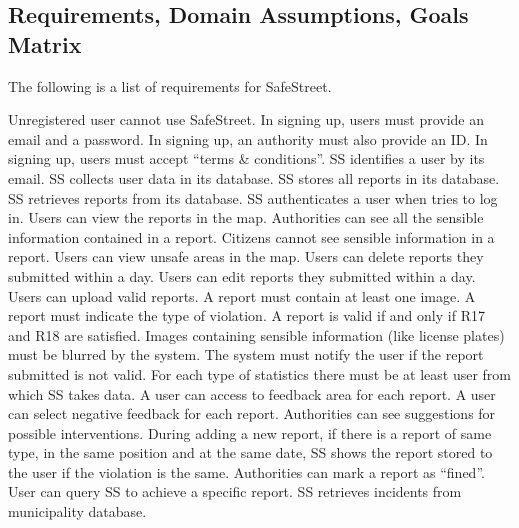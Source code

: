 \documentclass[../RASD.tex]{subfiles}
\begin{document}
            \subsection{Requirements, Domain Assumptions, Goals Matrix}\label{subsec:requirements,-domain-assumptions,-goals-matrix}
    The following is a list of requirements for SafeStreet.
    \begin{enumerate}
         Unregistered user cannot use SafeStreet.
         In signing up, users must provide an email and a password.
         In signing up, an authority must also provide an ID.
         In signing up, users must accept “terms \& conditions”.
         SS identifies a user by its email.
         SS collects user data in its database.
         SS stores all reports in its database.
         SS retrieves reports from its database.
         SS authenticates a user when tries to log in.
         Users can view the reports in the map.
         Authorities can see all the sensible information contained in a report.
         Citizens cannot see sensible information in a report.
         Users can view unsafe areas in the map.
         Users can delete reports they submitted within a day.
         Users can edit reports they submitted within a day.
         Users can upload valid reports.
         A report must contain at least one image.
         A report must indicate the type of violation.
         A report is valid if and only if R17 and R18 are satisfied.
         Images containing sensible information (like license plates) must be blurred by the system.
         The system must notify the user if the report submitted is not valid.
         For each type of statistics there must be at least user from which SS takes data.
         A user can access to feedback area for each report.
         A user can select negative feedback for each report.
         Authorities can see suggestions for possible interventions.
         During adding a new report, if there is a report of same type, in the same position and at the same date, SS shows the report stored to the user if the violation is the same.
         Authorities can mark a report as “fined”.
         User can query SS to achieve a specific report.
         SS retrieves incidents from municipality database.
    \end{enumerate}
\end{document}
